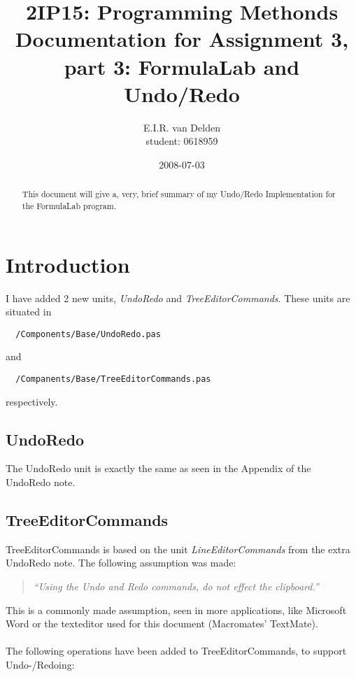 \documentclass[]{article}
\title{ 2IP15: Programming Methonds \\
Documentation for Assignment 3, part 3: FormulaLab and Undo/Redo}
\author{E.I.R. van Delden\\ student: 0618959}
\date{2008-07-03}
\begin{document}
\ifpdf
{}
\else
{}
\fi

\maketitle


\begin{abstract}
  This document will give a, very, brief summary of my Undo/Redo Implementation for the FormulaLab program.
\end{abstract}

\section{Introduction}
I have added 2 new units, \emph{UndoRedo} and \emph{TreeEditorCommands}. These units are situated in \begin{verbatim}
  /Components/Base/UndoRedo.pas
\end{verbatim}
and \begin{verbatim}
  /Companents/Base/TreeEditorCommands.pas
\end{verbatim}
respectively.\\

\subsection{UndoRedo} %
\label{sub:undoredo}
The UndoRedo unit is exactly the same as seen in the Appendix of the UndoRedo note.

\subsection{TreeEditorCommands} %
\label{sub:treeeditorcommands}
TreeEditorCommands is based on the unit \emph{LineEditorCommands} from the extra UndoRedo note. 
The following assumption was made:
\begin{quote}
 \emph{ ``Using the Undo and Redo commands, do not effect the clipboard.''}
\end{quote}
This is a commonly made assumption, seen in more applications, like Microsoft Word or the texteditor used for this document (Macromates' TextMate).\\ \\

The following operations have been added to TreeEditorCommands, to support Undo-/Redoing:
\end{document}
